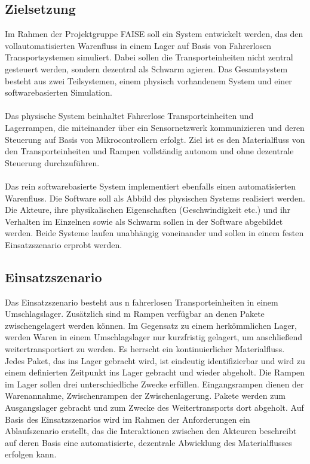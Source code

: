\subsection{Zielsetzung}
Im Rahmen der Projektgruppe FAISE soll ein System entwickelt werden, das den vollautomatisierten Warenfluss in einem Lager auf Basis von Fahrerlosen Transportsystemen simuliert. Dabei sollen die Transporteinheiten nicht zentral gesteuert werden, sondern dezentral als Schwarm agieren.
Das Gesamtsystem besteht aus zwei Teilsystemen, einem physisch vorhandenem System und einer softwarebasierten Simulation. 
\\\\
Das physische System beinhaltet Fahrerlose Transporteinheiten und Lagerrampen, die miteinander über ein Sensornetzwerk kommunizieren und deren Steuerung auf Basis von Mikrocontrollern erfolgt. Ziel ist es den Materialfluss von den Transporteinheiten und Rampen vollständig autonom und ohne dezentrale Steuerung durchzuführen. 
\\\\
Das rein softwarebasierte System implementiert ebenfalls einen automatisierten Warenfluss. Die Software soll als Abbild des physischen Systems realisiert werden. Die Akteure, ihre physikalischen Eigenschaften (Geschwindigkeit etc.) und ihr Verhalten im Einzelnen sowie als Schwarm sollen in der Software abgebildet werden. Beide Systeme laufen unabhängig voneinander und sollen in einem festen Einsatzszenario erprobt werden.

\subsection{Einsatzszenario}\label{Einsatzszenario} 
Das Einsatzszenario besteht aus n fahrerlosen Transporteinheiten in einem Umschlagslager. Zusätzlich sind m Rampen verfügbar an denen Pakete zwischengelagert werden können. Im Gegensatz zu einem herkömmlichen Lager, werden Waren in einem Umschlagslager nur kurzfristig gelagert, um anschließend weitertransportiert zu werden. Es herrscht ein kontinuierlicher Materialfluss. Jedes Paket, das ins Lager gebracht wird, ist eindeutig identifizierbar und wird zu einem definierten Zeitpunkt ins Lager gebracht und wieder abgeholt. Die Rampen im Lager sollen drei unterschiedliche Zwecke erfüllen. Eingangsrampen dienen der Warenannahme, Zwischenrampen der Zwischenlagerung. Pakete werden zum Ausgangslager gebracht und zum Zwecke des Weitertransports dort abgeholt. Auf Basis des Einsatzszenarios wird im Rahmen der Anforderungen ein Ablaufszenario erstellt, das die Interaktionen zwischen den Akteuren beschreibt auf deren Basis eine automatisierte, dezentrale Abwicklung des Materialflusses erfolgen kann.

